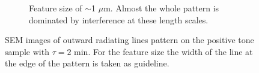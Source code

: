 \begin{figure}[htb]
\begin{subfigure}[t]{0.32\linewidth}
      	\label{fig:b2d2_q2}
    \end{subfigure}
    \hfill
    \begin{subfigure}[t]{0.32\linewidth}
      	\caption{Feature size of $\sim$1 $\mu$m. Almost the whole pattern is dominated by interference at these length scales.}
      	\label{fig:b2d3_q3}
    \end{subfigure}
    \caption{SEM images of outward radiating lines pattern on the positive tone sample with $\tau = 2$ min. For the feature size the width of the line at the edge of the pattern is taken as guideline.}
\end{figure}

